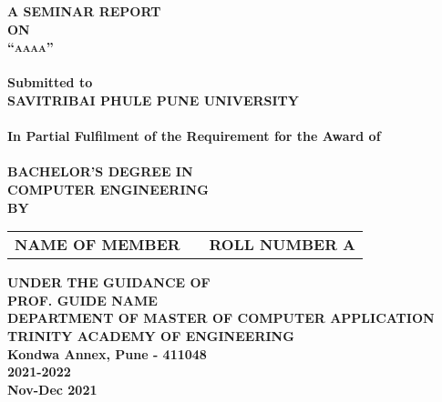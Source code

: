 \newpage
\begin{center}
\thispagestyle{empty}
\Large{\textbf{A SEMINAR REPORT\\ \large{ON}}}\\[0.7cm]
\LARGE{\textsc {\textbf{``aaaa''}}}\\[0.5cm]
\vspace{0.5cm}
\Large{\textbf{\\Submitted to}}
\LARGE{\textbf{\\SAVITRIBAI PHULE PUNE UNIVERSITY\\}}
\vspace{1cm}
\Large{\textbf{\\In Partial Fulfilment of the Requirement for the Award of\\}}
\Large{\textbf{\\BACHELOR'S DEGREE IN\\COMPUTER ENGINEERING}}
\vspace{1cm}
\Large{\textbf{\\BY}}\\[0.5cm]
\begin{table}[h]
\centering
\Large{
\begin{tabular}{>{\bfseries}lc>{\bfseries}r}
NAME OF MEMBER  & & ROLL NUMBER A\\
\end{tabular}}
\end{table}
\vspace{0.5cm}
\large{\textbf{UNDER THE GUIDANCE OF}}\\
\large{\textbf{PROF. GUIDE NAME}}\\
\vspace{1cm}
\large{\textbf{DEPARTMENT OF MASTER OF COMPUTER APPLICATION}}\\
\Large{\textbf{TRINITY ACADEMY OF ENGINEERING}}\\
\large{\textbf{Kondwa Annex, Pune - 411048}}
\large{\textbf{\\2021-2022}}\\
\vspace{1cm}
\Large{\textbf{Nov-Dec 2021\\}}
\newpage
\end{center}
